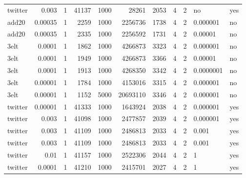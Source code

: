 \documentclass[11pt]{article}
\begin{document}
\begin{center}
\begin{tabular}{lrrrrrrrrll}
twitter & 0.003 & 1 & 41137 & 1000 & 28261 & 2053 & 4 & 2 & no & yes\\
add20 & 0.00035 & 1 & 2259 & 1000 & 2256736 & 1738 & 4 & 2 & 0.000001 & no\\
add20 & 0.00035 & 1 & 2335 & 1000 & 2256592 & 1731 & 4 & 2 & 0.00001 & no\\
3elt & 0.0001 & 1 & 1862 & 1000 & 4266873 & 3323 & 4 & 2 & 0.000001 & no\\
3elt & 0.0001 & 1 & 1949 & 1000 & 4266873 & 3366 & 4 & 2 & 0.00001 & no\\
3elt & 0.0001 & 1 & 1913 & 1000 & 4268350 & 3342 & 4 & 2 & 0.0000001 & no\\
3elt & 0.00001 & 1 & 1784 & 1000 & 4153016 & 3315 & 4 & 2 & 0.000001 & no\\
3elt & 0.00001 & 1 & 1152 & 5000 & 20693110 & 3346 & 4 & 2 & 0.000001 & no\\
twitter & 0.00001 & 1 & 41333 & 1000 & 1643924 & 2038 & 4 & 2 & 0.000001 & yes\\
twitter & 0.003 & 1 & 41098 & 1000 & 2477857 & 2039 & 4 & 2 & 0.000001 & yes\\
twitter & 0.003 & 1 & 41109 & 1000 & 2486813 & 2033 & 4 & 2 & 0.001 & yes\\
twitter & 0.003 & 1 & 41109 & 1000 & 2486813 & 2033 & 4 & 2 & 0.001 & yes\\
twitter & 0.01 & 1 & 41157 & 1000 & 2522306 & 2044 & 4 & 2 & 1 & yes\\
twitter & 0.0001 & 1 & 41210 & 1000 & 2415701 & 2027 & 4 & 2 & 1 & yes\\
\end{tabular}
\end{center}
\end{document}
